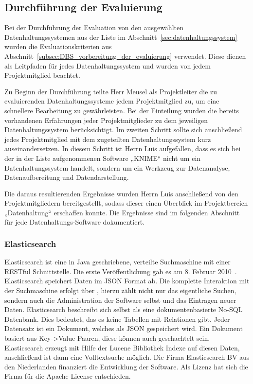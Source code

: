 \subsection{Durchführung der Evaluierung}
\label{subsec:durchfuehrung_der_evaluierung}
Bei der Durchführung der Evaluation von den ausgewählten Datenhaltungssystemen
aus der Liste im Abschnitt~\ref{sec:datenhaltungssystem} wurden die
Evaluationskriterien aus
Abschnitt~\ref{subsec:DBS_vorbereitung_der_evaluierung} verwendet. Diese
dienen als Leitpfaden für jedes Datenhaltungssystem und wurden von jedem
Projektmitglied beachtet.

Zu Beginn der Durchführung teilte Herr Meusel als Projektleiter die zu
evaluierenden Datenhaltungssysteme jedem Projektmitglied zu, um eine schnellere
Bearbeitung zu gewährleisten. Bei der Einteilung wurden die bereits vorhandenen
Erfahrungen jeder Projektmitglieder zu dem jeweiligen Datenhaltungssystem
berücksichtigt. Im zweiten Schritt sollte sich anschließend jedes
Projektmitglied mit dem zugeteilten Datenhaltungssystem kurz auseinandersetzen.
In diesem Schritt ist Herrn Luis aufgefallen, dass es sich bei der in der Liste
aufgenommenen Software „KNIME“ nicht um ein Datenhaltungssystem handelt,
sondern um ein Werkzeug zur Datenanalyse, Datenaufbereitung und
Datendarstellung.

Die daraus resultierenden Ergebnisse wurden Herrn Luis anschließend von den
Projektmitgliedern bereitgestellt, sodass dieser einen Überblick im
Projektbereich „Datenhaltung“ erschaffen konnte. Die Ergebnisse sind im
folgenden Abschnitt für jede Datenhaltungs\hyp{}Software dokumentiert.
\nl%

\subsubsection{Elasticsearch}
\label{subsubsec:elasticsearch}
Elasticsearch ist eine in Java geschriebene, verteilte Suchmaschine mit einer
\gls{RESTful} Schnittstelle. Die erste Veröffentlichung gab es am 8. Februar
2010~\cite{es_release}. Elasticsearch speichert Daten im \gls{JSON} Format ab.
Die komplette Interaktion mit der Suchmaschine erfolgt über
, hierzu zählt nicht nur das eigentliche Suchen, sondern
auch die Administration der Software selbst und das Eintragen neuer Daten.
Elasticsearch beschreibt sich selbst als eine dokumentenbasierte
No\hyp{}\gls{SQL} Datenbank. Dies bedeutet, das es keine Tabellen mit
Relationen gibt. Jeder Datensatz ist ein Dokument, welches als \gls{JSON}
gespeichert wird. Ein Dokument basiert aus Key->Value Paaren, diese können auch
geschachtelt sein. Elasticsearch erzeugt mit Hilfe der \gls{Lucene} Bibliothek
Indexe auf diesen Daten, anschließend ist dann eine Volltextsuche möglich. Die
Firma Elasticsearch BV aus den Niederlanden finanziert die Entwicklung der
Software. Als Lizenz hat sich die Firma für die Apache License entschieden.


